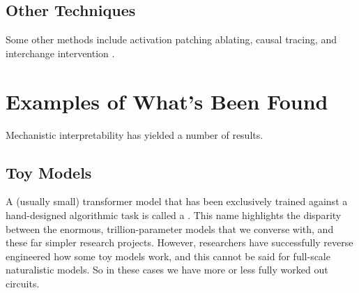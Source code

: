 
\subsection{Other Techniques}


Some other methods include activation patching ablating,  causal tracing, and interchange intervention .

\section{Examples of What’s Been Found}

Mechanistic interpretability has yielded a number of results.

\subsection{Toy Models}

A (usually small) transformer model that has been exclusively trained against a hand-designed algorithmic task is called a . This name highlights the disparity between the enormous, trillion-parameter models that we converse with, and these far simpler research projects. However, researchers have successfully reverse engineered how some toy models work, and this cannot be said for full-scale naturalistic models.  So in these cases we have more or less fully worked out circuits.

